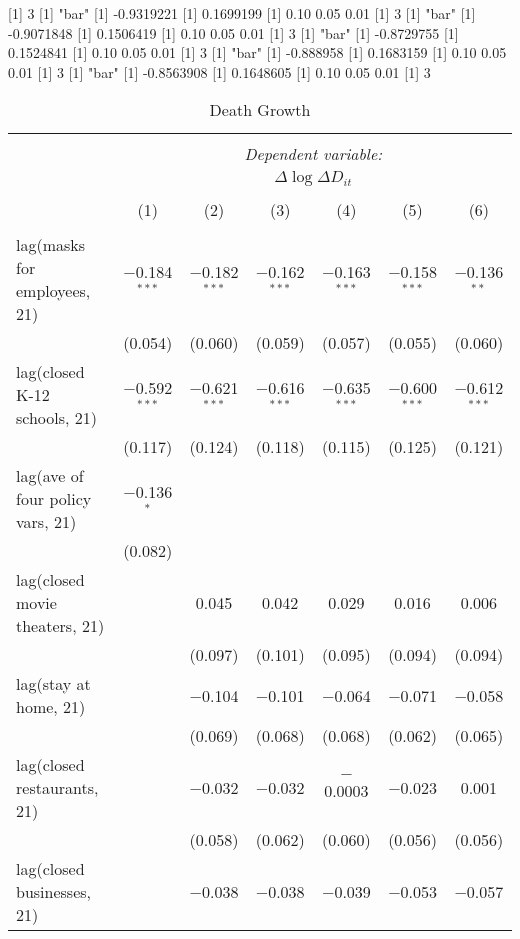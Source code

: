 [1] 3
[1] "bar"
[1] -0.9319221
[1] 0.1699199
[1] 0.10 0.05 0.01
[1] 3
[1] "bar"
[1] -0.9071848
[1] 0.1506419
[1] 0.10 0.05 0.01
[1] 3
[1] "bar"
[1] -0.8729755
[1] 0.1524841
[1] 0.10 0.05 0.01
[1] 3
[1] "bar"
[1] -0.888958
[1] 0.1683159
[1] 0.10 0.05 0.01
[1] 3
[1] "bar"
[1] -0.8563908
[1] 0.1648605
[1] 0.10 0.05 0.01
[1] 3

\begin{table}[!htbp] \centering 
  \caption{Death Growth} 
  \label{} 
\begin{tabular}{@{\extracolsep{1pt}}lcccccc} 
\\[-1.8ex]\hline 
\hline \\[-1.8ex] 
 & \multicolumn{6}{c}{\textit{Dependent variable:}} \\ 
\cline{2-7} 
 & \multicolumn{6}{c}{$\Delta \log \Delta D_{it}$} \\ 
\\[-1.8ex] & (1) & (2) & (3) & (4) & (5) & (6)\\ 
\hline \\[-1.8ex] 
 lag(masks for employees, 21) & $-$0.184$^{***}$ & $-$0.182$^{***}$ & $-$0.162$^{***}$ & $-$0.163$^{***}$ & $-$0.158$^{***}$ & $-$0.136$^{**}$ \\ 
  & (0.054) & (0.060) & (0.059) & (0.057) & (0.055) & (0.060) \\ 
  lag(closed K-12 schools, 21) & $-$0.592$^{***}$ & $-$0.621$^{***}$ & $-$0.616$^{***}$ & $-$0.635$^{***}$ & $-$0.600$^{***}$ & $-$0.612$^{***}$ \\ 
  & (0.117) & (0.124) & (0.118) & (0.115) & (0.125) & (0.121) \\ 
  lag(ave of four policy vars, 21) & $-$0.136$^{*}$ &  &  &  &  &  \\ 
  & (0.082) &  &  &  &  &  \\ 
  lag(closed movie theaters, 21) &  & 0.045 & 0.042 & 0.029 & 0.016 & 0.006 \\ 
  &  & (0.097) & (0.101) & (0.095) & (0.094) & (0.094) \\ 
  lag(stay at home, 21) &  & $-$0.104 & $-$0.101 & $-$0.064 & $-$0.071 & $-$0.058 \\ 
  &  & (0.069) & (0.068) & (0.068) & (0.062) & (0.065) \\ 
  lag(closed restaurants, 21) &  & $-$0.032 & $-$0.032 & $-$0.0003 & $-$0.023 & 0.001 \\ 
  &  & (0.058) & (0.062) & (0.060) & (0.056) & (0.056) \\ 
  lag(closed businesses, 21) &  & $-$0.038 & $-$0.038 & $-$0.039 & $-$0.053 & $-$0.057 \\ 

\end{tabular}
\end{table}

